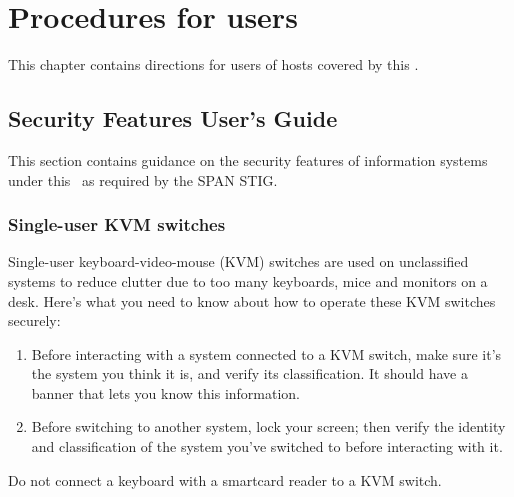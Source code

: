 \chapter{Procedures for users}
\label{ProceduresForUsers}

This chapter contains directions for users of hosts covered by this
\CMITSPolicy .



\section{Security Features User's Guide}
\label{SFUG}

This section contains guidance on the security features of information
systems under this \CMITSPolicy\ as required by the SPAN STIG.

\subsection{Single-user KVM switches}

Single-user keyboard-video-mouse (KVM) switches are used on unclassified
systems to reduce clutter due to too many keyboards, mice and monitors on
a desk.  Here's what you need to know
about how to operate these KVM switches securely:

\begin{enumerate}
\item Before interacting with a system connected to a KVM switch, make
    sure it's the system you think it is, and verify its classification.
    It should have a banner that lets you know this information.
\item Before switching to another system, lock your screen; then verify
    the identity and classification of the system you've switched to
    before interacting with it.
\end{enumerate}

 Do not connect a keyboard with a
smartcard reader to a KVM switch.

